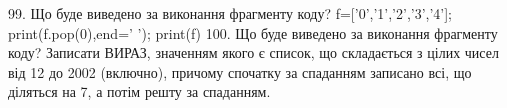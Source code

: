 \documentclass[11pt]{article}
\begin{document}
99. Що буде виведено за виконання фрагменту коду?
f=['0','1','2','3','4']; print(f.pop(0),end=' '); print(f)
100. Що буде виведено за виконання фрагменту коду?
Записати ВИРАЗ, значенням якого є список, що складається з цілих чисел від 12 до 2002 (включно), причому спочатку за спаданням записано всі, що діляться на 7, а потім решту за спаданням.




































































































\newpage
\end{document}
